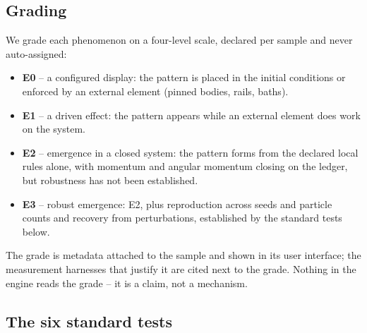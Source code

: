 \documentclass[aps,reprint,amsmath,amssymb,nofootinbib,superscriptaddress,floatfix]{revtex4-2}
\begin{document}
\subsection{Grading}

We grade each phenomenon on a four-level scale, declared per sample and
never auto-assigned:

\begin{itemize}
\item \textbf{E0} -- a configured display: the pattern is placed in the
  initial conditions or enforced by an external element (pinned bodies,
  rails, baths).
\item \textbf{E1} -- a driven effect: the pattern appears while an
  external element does work on the system.
\item \textbf{E2} -- emergence in a closed system: the pattern forms from
  the declared local rules alone, with momentum and angular momentum
  closing on the ledger, but robustness has not been established.
\item \textbf{E3} -- robust emergence: E2, plus reproduction across seeds
  and particle counts and recovery from perturbations, established by the
  standard tests below.
\end{itemize}

The grade is metadata attached to the sample and shown in its user
interface; the measurement harnesses that justify it are cited next to
the grade. Nothing in the engine reads the grade -- it is a claim, not a
mechanism.

\subsection{The six standard tests}
\end{document}
